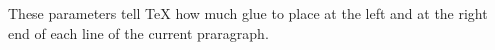 \documentclass{article}
\begin{document}
\setlength\leftskip{4em}
\setlength\rightskip{1em}
These parameters tell \TeX{} how much glue
to place at the left and at the right end 
of each line of the current praragraph.
\end{document}
